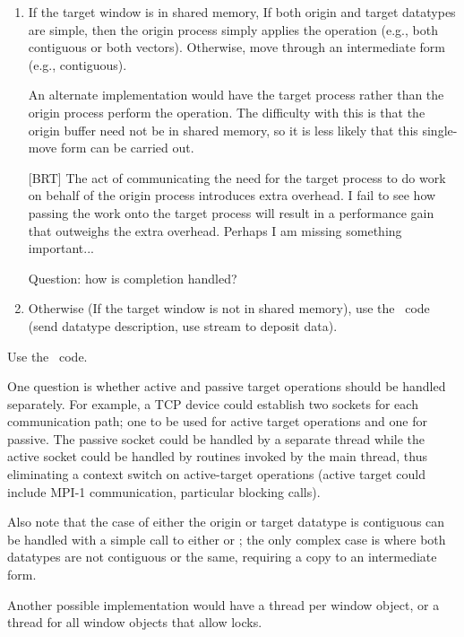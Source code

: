 \documentclass{article}
\begin{document}
\begin{shmem}
\begin{enumerate}
\item If the target window is in shared memory, 
If both origin and target datatypes are simple, then the origin process simply
applies the 
operation (e.g., both contiguous or both vectors).  Otherwise, move through an
intermediate form (e.g., contiguous).  

An alternate implementation would have the target process rather than the
origin process perform the operation.  The difficulty with this is that the
origin buffer need not be in shared memory, so it is less likely that this
single-move form can be carried out.  

[BRT] The act of communicating the need for the target process to do
work on behalf of the origin process introduces extra overhead.  I
fail to see how passing the work onto the target process will result
in a performance gain that outweighs the extra overhead.  Perhaps I am
missing something important...

Question: how is completion handled?  

\item Otherwise (If the target window is not in shared memory),
use the \tcpname\ code (send datatype description, use stream to deposit
data).

\end{enumerate}
\end{shmem}
\begin{via}
Use the \tcpname\ code.  
\end{via}

One question is whether active and passive target operations should be handled
separately.  For example, a TCP device could establish two sockets for each
communication path; one to be used for active target operations and one for
passive.  The passive socket could be handled by a separate thread while the
active socket could be handled by routines invoked by the main thread, thus
eliminating a context switch on active-target operations (active target could
include MPI-1 communication, particular blocking calls).

Also note that the case of either the origin or target datatype is
contiguous can be handled with a simple call to either
 or ; the only complex case
is where both datatypes are not contiguous or the same, requiring a
copy to an intermediate form.

Another possible implementation would have a thread per window object,
or a thread for all window objects that allow locks.
\end{document}
